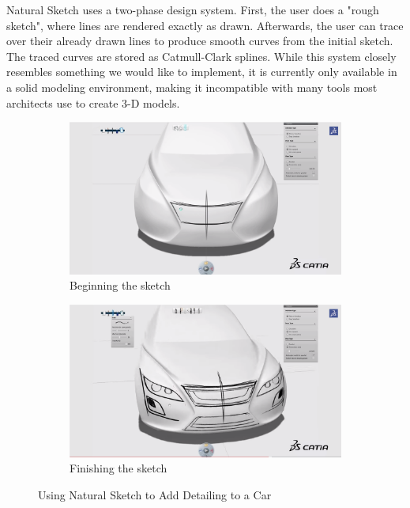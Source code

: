 \documentclass[11pt]{report}
\begin{document}
Natural Sketch uses a two-phase design system. First, the user does a "rough sketch", where lines are rendered exactly as drawn. 
Afterwards, the user can trace over their already drawn lines to produce smooth curves from the initial sketch.
The traced curves are stored as Catmull-Clark splines.
While this system closely resembles something we would like to implement, it is currently only available in a solid modeling environment, making it incompatible with many tools most architects use to create 3-D models.

\begin{figure}

\begin{subfigure}{\textwidth}
\includegraphics[width=\textwidth]{CATIA1}
\caption{Beginning the sketch}
\end{subfigure}
\begin{subfigure}{\textwidth}
\includegraphics[width=\textwidth]{CATIA2}
\caption{Finishing the sketch}
\end{subfigure}

\caption{Using Natural Sketch to Add Detailing to a Car}
\end{figure}
\end{document}
